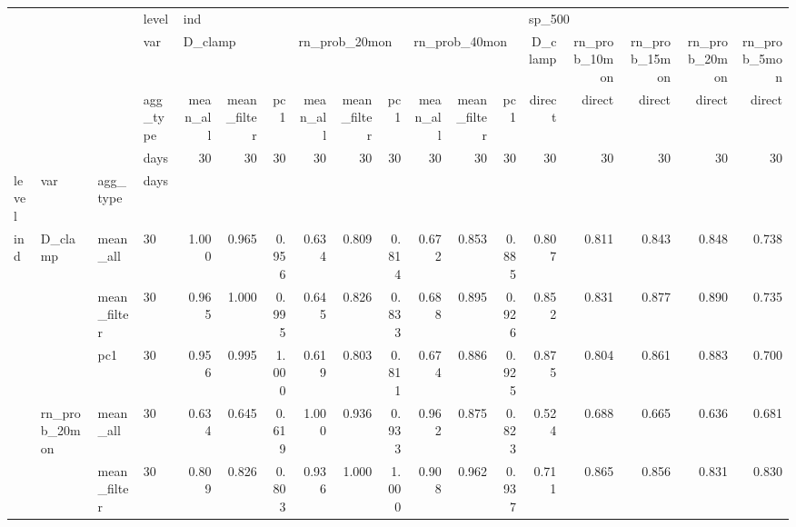 \begin{tabular}{llllrrrrrrrrrrrrrr}
\toprule
       &              &        & level & \multicolumn{9}{l}{ind} & \multicolumn{5}{l}{sp\_500} \\
       &              &        & var & \multicolumn{3}{l}{D\_clamp} & \multicolumn{3}{l}{rn\_prob\_20mon} & \multicolumn{3}{l}{rn\_prob\_40mon} & D\_clamp & rn\_prob\_10mon & rn\_prob\_15mon & rn\_prob\_20mon & rn\_prob\_5mon \\
       &              &        & agg\_type & mean\_all & mean\_filter &    pc1 &      mean\_all & mean\_filter &    pc1 &      mean\_all & mean\_filter &    pc1 &  direct &        direct &        direct &        direct &       direct \\
       &              &        & days &       30 &          30 &     30 &            30 &          30 &     30 &            30 &          30 &     30 &      30 &            30 &            30 &            30 &           30 \\
level & var & agg\_type & days &          &             &        &               &             &        &               &             &        &         &               &               &               &              \\
\midrule
ind & D\_clamp & mean\_all & 30 &    1.000 &       0.965 &  0.956 &         0.634 &       0.809 &  0.814 &         0.672 &       0.853 &  0.885 &   0.807 &         0.811 &         0.843 &         0.848 &        0.738 \\
       &              & mean\_filter & 30 &    0.965 &       1.000 &  0.995 &         0.645 &       0.826 &  0.833 &         0.688 &       0.895 &  0.926 &   0.852 &         0.831 &         0.877 &         0.890 &        0.735 \\
       &              & pc1 & 30 &    0.956 &       0.995 &  1.000 &         0.619 &       0.803 &  0.811 &         0.674 &       0.886 &  0.925 &   0.875 &         0.804 &         0.861 &         0.883 &        0.700 \\
       & rn\_prob\_20mon & mean\_all & 30 &    0.634 &       0.645 &  0.619 &         1.000 &       0.936 &  0.933 &         0.962 &       0.875 &  0.823 &   0.524 &         0.688 &         0.665 &         0.636 &        0.681 \\
       &              & mean\_filter & 30 &    0.809 &       0.826 &  0.803 &         0.936 &       1.000 &  1.000 &         0.908 &       0.962 &  0.937 &   0.711 &         0.865 &         0.856 &         0.831 &        0.830 \\

\end{tabular}
